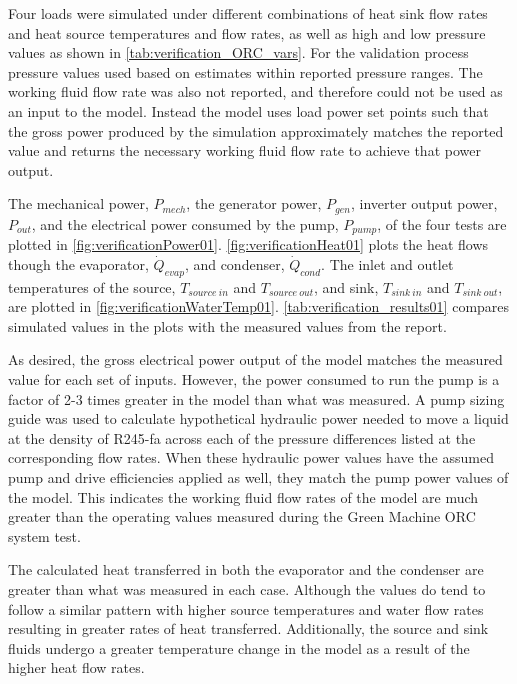 Four loads were simulated under different combinations of heat sink flow rates and heat source temperatures and flow rates, as well as high and low pressure values as shown in  \autoref{tab:verification_ORC_vars}. For the validation process pressure values used based on estimates within reported pressure ranges. The working fluid flow rate was also not reported, and therefore could not be used as an input to the model. Instead the model uses load power set points such that the gross power produced by the simulation approximately matches the reported value and returns the necessary working fluid flow rate to achieve that power output.  


The mechanical power, $P_{mech}$, the generator power, $P_{gen}$, inverter output power, $P_{out}$, and the electrical power consumed by the pump, $P_{pump}$, of the four tests are plotted in \autoref{fig:verificationPower01}.  
\autoref{fig:verificationHeat01}  
plots the heat flows though the evaporator, $\dot{Q}_{evap}$, and condenser,  $\dot{Q}_{cond}$. The inlet and outlet temperatures of the source, $T_{source\ in}$ and $T_{source\ out}$, and sink, $T_{sink\ in}$ and $T_{sink\ out}$, are plotted in \autoref{fig:verificationWaterTemp01}.  
\autoref{tab:verification_results01} compares simulated values in the plots with the measured values from the report.


As desired, the gross electrical power output of the model matches the measured value for each set of inputs. However, the power consumed to run the pump is a factor of 2-3 times greater in the model than what was measured. A pump sizing guide \cite{CheGuide2017} was used to calculate hypothetical hydraulic power needed to move a liquid at the density of R245-fa across each of the pressure differences listed at the corresponding flow rates. When these hydraulic power values have the assumed pump and drive efficiencies applied as well, they match the pump power values of the model. This indicates the working fluid flow rates of the model are much greater than the operating values measured during the Green Machine ORC system test.

The calculated heat transferred in both the evaporator and the condenser are greater than what was measured in each case. Although the values do tend to follow a similar pattern with higher source temperatures and water flow rates resulting in greater rates of heat transferred. Additionally, the source and sink fluids undergo a greater temperature change in the model as a result of the higher heat flow rates.


